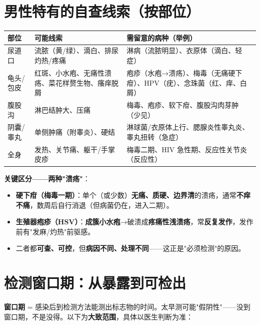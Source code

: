 \documentclass[12pt,UTF8,openany]{ctexbook}
\begin{document}
\section{男性特有的自查线索（按部位）}

\begin{tabularx}{\textwidth}{l X X}
\toprule
\textbf{部位} & \textbf{可能线索} & \textbf{需留意的病种（举例）} \\
\midrule
尿道口 & 流脓（黄/绿）、滴白、排尿灼热/疼痛 & 淋病（流脓明显）、衣原体（滴白、轻症） \\
龟头/包皮 & 红斑、小水疱、无痛性溃疡、菜花样赘生物、瘙痒脱屑 & 疱疹（水疱→溃疡）、梅毒（无痛硬下疳）、HPV（疣）、念珠菌（红、痒、白屑） \\
腹股沟 & 淋巴结肿大、压痛 & 梅毒、疱疹、软下疳、腹股沟肉芽肿（少见） \\
阴囊/睾丸 & 单侧肿痛（附睾炎）、硬结 & 淋球菌/衣原体上行、腮腺炎性睾丸炎、睾丸扭转（急症） \\
全身 & 发热、关节痛、躯干/手掌皮疹 & 梅毒二期、HIV 急性期、反应性关节炎（反应性） \\
\bottomrule
\end{tabularx}

\noindent\textbf{关键区分——两种"溃疡"}：
\begin{itemize}[leftmargin=2em,itemsep=0.3em]
  \item \textbf{硬下疳（梅毒一期）}：单个（或少数）\textbf{无痛、质硬、边界清}的溃疡，通常\textbf{不痒不痛}，数周后自行消退（但病菌仍在，进入二期）。
  \item \textbf{生殖器疱疹（HSV）}：\textbf{成簇小水疱}→破溃成\textbf{疼痛性浅溃疡}，常\textbf{反复发作}，发作前有"发麻/灼热"前驱感。
  \item 二者都\textbf{可查、可控}，但\textbf{病因不同、处理不同}——这正是"必须检测"的原因。
\end{itemize}

\section{检测窗口期：从暴露到可检出}

\textbf{窗口期} = 感染后到检测方法能测出标志物的时间。太早测可能"假阴性"——没到窗口期，不是没得。以下为\textbf{大致范围}，具体以医生判断为准：
\end{document}
